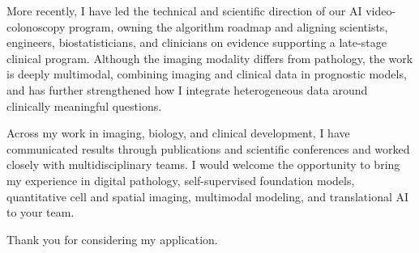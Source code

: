 \documentclass[10pt, letter]{ag-cv} %
\begin{document}
\begin{cvletter}
\begin{flushleft}
More recently, I have led the technical and scientific direction of our AI video-colonoscopy program, owning the algorithm roadmap and aligning scientists, engineers, biostatisticians, and clinicians on evidence supporting a late-stage clinical program. Although the imaging modality differs from pathology, the work is deeply multimodal, combining imaging and clinical data in prognostic models, and has further strengthened how I integrate heterogeneous data around clinically meaningful questions.

Across my work in imaging, biology, and clinical development, I have communicated results through publications and scientific conferences and worked closely with multidisciplinary teams. I would welcome the opportunity to bring my experience in digital pathology, self-supervised foundation models, quantitative cell and spatial imaging, multimodal modeling, and translational AI to your team.

Thank you for considering my application.
\end{flushleft}

\end{cvletter}


\makeletterclosing %
\end{document}
